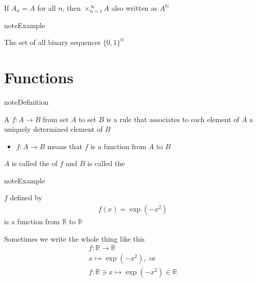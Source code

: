 \documentclass[letterpaper,10pt,english]{jupyterBook}
\begin{document}
\sphinxAtStartPar
If \(A_n = A\) for all \(n\), then \(\times_{n=1}^{\infty} A\) also written as \(A^{\mathbb{N}}\)

\begin{sphinxadmonition}{note}{Example}

\sphinxAtStartPar
The set of all binary sequences \(\{0, 1\}^{\mathbb{N}}\)
\end{sphinxadmonition}


\section{Functions}
\label{\detokenize{03.set_theory:functions}}
\begin{sphinxadmonition}{note}{Definition}

\sphinxAtStartPar
A  \(f \colon A \rightarrow B\) from set \(A\) to set \(B\) is a rule that
associates to each element of \(A\) a uniquely determined element of \(B\)
\end{sphinxadmonition}
\begin{itemize}
\item {} 
\sphinxAtStartPar
\(f \colon A \to B\) means that \(f\) is a function from \(A\) to \(B\)

\end{itemize}

\begin{figure}[htbp]
\centering

\noindent{}
\end{figure}

\sphinxAtStartPar
\(A\) is called the  of \(f\) and \(B\) is called the 

\begin{sphinxadmonition}{note}{Example}

\sphinxAtStartPar
\(f\) defined by
\begin{equation*}
\begin{split}
f(x) = \exp(-x^2)
\end{split}
\end{equation*}
\sphinxAtStartPar
is a function from \(\mathbb{R}\) to \(\mathbb{R}\)

\sphinxAtStartPar
Sometimes we write the whole thing like this
\begin{equation*}
\begin{split}
f \colon \mathbb{R} \to \mathbb{R} \\
x \mapsto \exp(-x^2), \text{ or}\\
f \colon \mathbb{R} \ni x \mapsto \exp(-x^2) \in \mathbb{R} 
\end{split}
\end{equation*}\end{sphinxadmonition}
\end{document}

